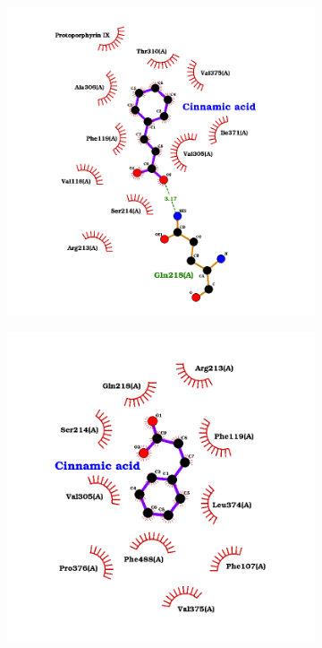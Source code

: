 \documentclass[12pt]{article}
\begin{document}
	
	\FloatBarrier
	\begin{figure}[h!]
		\centering
		\begin{subfigure}[h!]{0.35\textwidth}
			\hspace{2cm}
			\includegraphics[width=\textwidth]{../2/Dock/Dock2/best.png}
			\caption{}
		\end{subfigure}
		\hfill
		\begin{subfigure}[h!]{0.35\textwidth}
			\hspace{-2cm}
			\includegraphics[width=\textwidth]{../2/Dock/Dock2/best2.png}

\end{subfigure}
\end{figure}
\end{document}

